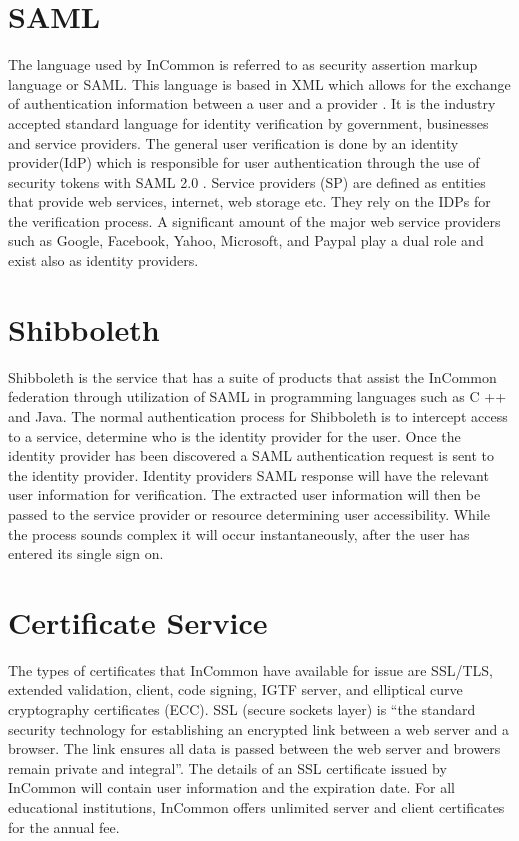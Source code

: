 \documentclass[9pt,twocolumn,twoside]{../../styles/osajnl}
\begin{document}
\section{SAML}

The language used by InCommon is referred to as security assertion
markup language or SAML.  This language is based in XML which allows
for the exchange of authentication information between a user and a
provider \cite{www-wiki}.  It is the industry accepted standard
language for identity verification by government, businesses and
service providers.  The general user verification is done by an
identity provider(IdP) which is responsible for user authentication
through the use of security tokens with SAML 2.0
\cite{www-empower}. Service providers (SP) are defined as entities
that provide web services, internet, web storage etc.  They rely on
the IDPs for the verification process.  A significant amount of the
major web service providers such as Google, Facebook, Yahoo,
Microsoft, and Paypal play a dual role and exist also as identity
providers.

\section{Shibboleth}

Shibboleth is the service that has a suite of products that assist the
InCommon federation through utilization of SAML in programming
languages such as C ++ and Java\cite{www-shibboleth}.  The normal
authentication process for Shibboleth is to intercept access to a
service, determine who is the identity provider for the user.  Once
the identity provider has been discovered a SAML authentication
request is sent to the identity provider.  Identity providers SAML
response will have the relevant user information for verification.
The extracted user information will then be passed to the service
provider or resource determining user accessibility.  While the
process sounds complex it will occur instantaneously, after the user
has entered its single sign on.


\section{Certificate Service}

The types of certificates that InCommon have available for issue are
SSL/TLS, extended validation, client, code signing, IGTF server, and
elliptical curve cryptography certificates (ECC).  SSL (secure sockets
layer) is “the standard security technology for establishing an
encrypted link between a web server and a browser.  The link ensures
all data is passed between the web server and browers remain private
and integral”\cite{www-ssl}.  The details of an SSL certificate
issued by InCommon will contain user information and the
expiration date. For all educational institutions, InCommon offers
unlimited server and client certificates for the annual fee.
\end{document}
